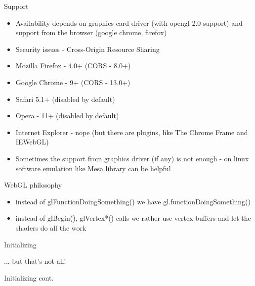 \documentclass{beamer}
\begin{document}
\begin{frame}{Support}

\begin{itemize}
\item Availability depends on graphics card driver (with opengl 2.0 support) and
support from the browser (google chrome, firefox)
\item Security issues - Cross-Origin Resource Sharing
\item Mozilla Firefox - 4.0+ (CORS - 8.0+)
\item Google Chrome - 9+ (CORS - 13.0+)
\item Safari 5.1+ (disabled by default)
\item Opera - 11+ (disabled by default)
\item Internet Explorer - nope (but there are plugins, like The Chrome Frame and IEWebGL)

\item Sometimes the support from graphics driver (if any) is not enough - on
linux software emulation like Mesa library can be helpful
\end{itemize}

\end{frame}

\begin{frame}{WebGL philosophy}

\begin{itemize}
\item instead of glFunctionDoingSomething() we have gl.functionDoingSomething()
\item instead of glBegin(), glVertex*() calls we rather use vertex buffers and
let the shaders do all the work
\end{itemize}

\end{frame}


\begin{frame}{Initializing}



... but that's not all!

\end{frame}


\begin{frame}{Initializing cont.}



\end{frame}
\end{document}
